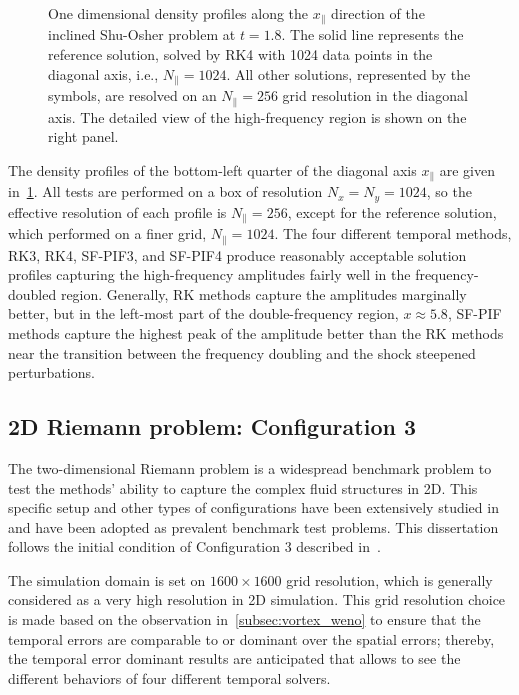 \begin{figure}
\begin{subfigure}{70mm}
    \end{subfigure}
    \caption{One dimensional density profiles along the \( x_{\parallel} \) direction 
        of the inclined Shu-Osher problem at \( t = 1.8 \).
        The solid line represents the reference solution,
        solved by RK4 with 1024 data points
        in the diagonal axis, i.e., \( N_{\parallel} = 1024 \).
        All other solutions, represented by the symbols, are resolved on an
        \( N_{\parallel} = 256 \) grid resolution in the diagonal axis.
        The detailed view of the high-frequency region is shown
        on the right panel.
    }\label{fig:shu45}
\end{figure}

The density profiles of the bottom-left quarter of the diagonal axis \( x_{\parallel} \)
are given in~\cref{fig:shu45}. All tests are performed on a box of resolution \( N_{x} = N_{y} = 1024 \),
so the effective resolution of each profile is \( N_{\parallel} = 256 \),
except for the reference solution, which performed on a finer grid, \( N_{\parallel} = 1024 \).
The four different temporal methods, RK3, RK4, SF-PIF3, and SF-PIF4 produce
reasonably acceptable solution profiles capturing the high-frequency amplitudes
fairly well in the frequency-doubled region.
Generally, RK methods capture the amplitudes marginally better,
but in the left-most part of the double-frequency region, \( x \approx 5.8 \),
SF-PIF methods capture the highest peak of the amplitude better than
the RK methods near the transition between the frequency 
doubling and the shock steepened perturbations.




\subsection{2D Riemann problem: Configuration 3}\label{subsec:2drp_c3_weno}

The two-dimensional Riemann problem is a widespread benchmark problem to test
the methods' ability to capture the complex fluid structures in 2D.
This specific setup and other types of configurations have been
extensively studied in~\cite{zhang1990conjecture, schulz1993classification, schulz1993numerical}
and have been adopted as prevalent benchmark test problems.
This dissertation follows the initial condition of Configuration 3
described in~\cite{don2016hybrid,lee2017piecewise,lee2021single,lee2021recursive}.

The simulation domain is set on \( 1600 \times 1600 \) grid resolution,
which is generally considered as a very high resolution in 2D simulation.
This grid resolution choice is made based on the observation in~\cref{subsec:vortex_weno}
to ensure that the temporal errors are comparable to or dominant over the spatial errors;
thereby, the temporal error dominant results are anticipated that allows
to see the different behaviors of four different temporal solvers.

